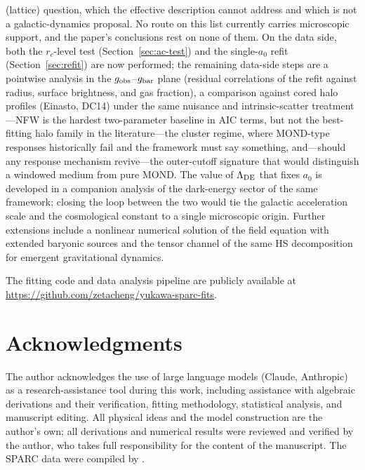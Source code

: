 \documentclass[11pt,a4paper]{article}
\begin{document}
(lattice) question, which the effective description cannot address
and which is not a galactic-dynamics proposal.  No route on this
list currently carries microscopic support, and the paper's
conclusions rest on none of them.
On the data side, both the $r_c$-level test
(Section~\ref{sec:ac-test}) and the single-$a_0$ refit
(Section~\ref{sec:refit}) are now performed; the remaining data-side
steps are a pointwise analysis in the
$g_{\rm obs}$--$g_{\rm bar}$ plane (residual correlations of the
refit against radius, surface brightness, and gas fraction), a
comparison against cored halo profiles (Einasto, DC14) under the
same nuisance and intrinsic-scatter treatment---NFW is the hardest
two-parameter baseline in AIC terms, but not the best-fitting halo
family in the literature---the cluster regime, where MOND-type
responses historically fail and the framework must say something,
and---should any response mechanism revive---the outer-cutoff
signature that would distinguish a windowed medium from pure MOND.  The value of $\Lambda_{\rm DE}$ that fixes
$a_0$ is developed in a companion analysis of the dark-energy sector
of the same framework; closing the loop between the two would tie the
galactic acceleration scale and the cosmological constant to a single
microscopic origin.  Further extensions include a nonlinear numerical
solution of the field equation with extended baryonic sources and the
tensor channel of the same HS decomposition for emergent
gravitational dynamics.

The fitting code and data analysis pipeline are publicly available
at \url{https://github.com/zetacheng/yukawa-sparc-fits}.


\section*{Acknowledgments}

The author acknowledges the use of large language models
(Claude, Anthropic) as a research-assistance tool during this
work, including assistance with algebraic derivations and their
verification, fitting methodology, statistical analysis, and
manuscript editing.
All physical ideas and the model construction are the author's
own; all derivations and numerical results were reviewed and
verified by the author, who takes full responsibility for the
content of the manuscript.
The SPARC data were compiled by \cite{Lelli:2016zqa}.
\end{document}
